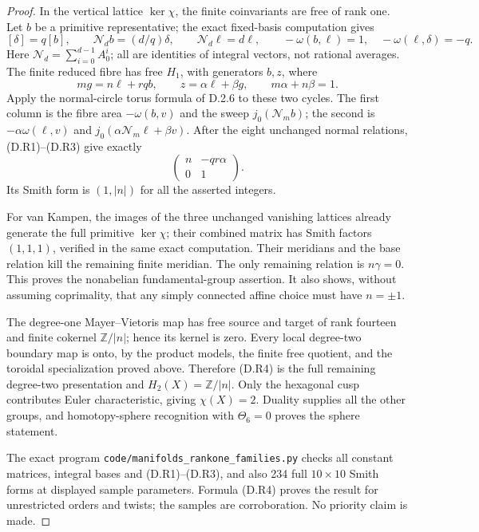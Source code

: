 \begin{proof}
In the vertical lattice $\ker\chi$, the finite coinvariants
are free of rank one. Let $b$ be a primitive representative;
the exact fixed-basis computation gives
\[
 [\delta]=q[b],\qquad
 \mathcal N_d b=(d/q)\delta,\qquad
 \mathcal N_d\ell=d\ell,\qquad
 -\omega(b,\ell)=1,\quad
 -\omega(\ell,\delta)=-q.
 \tag{D.R3}
\]
Here $\mathcal N_d=\sum_{i=0}^{d-1}A_0^i$; all are
identities of integral vectors, not rational averages.
The finite reduced fibre has free $H_1$, with generators
$b,z$, where
\[
 mg=n\ell+rq b,\qquad
 z=\alpha\ell+\beta g,\qquad m\alpha+n\beta=1.
\]
Apply the normal-circle torus formula of D.2.6 to these two
cycles. The first column is the fibre area
$-\omega(b,v)$ and the sweep $j_0(\mathcal N_m b)$;
the second is $-\alpha\omega(\ell,v)$ and
$j_0(\alpha\mathcal N_m\ell+\beta v)$.
After the eight unchanged normal relations, (D.R1)--(D.R3)
give exactly
\[
 \begin{pmatrix}n&-qr\alpha\\0&1\end{pmatrix}.
 \tag{D.R4}
\]
Its Smith form is $(1,|n|)$ for all the asserted integers.

For van Kampen, the images of the three unchanged vanishing
lattices already generate the full primitive $\ker\chi$;
their combined matrix has Smith factors $(1,1,1)$, verified
in the same exact computation. Their meridians and the base
relation kill the remaining finite meridian. The only remaining
relation is $n\gamma=0$. This proves the nonabelian
fundamental-group assertion. It also shows, without assuming
coprimality, that any simply connected affine choice must have
$n=\pm1$.

The degree-one Mayer--Vietoris map has free source and target
of rank fourteen and finite cokernel $\mathbb Z/|n|$; hence
its kernel is zero. Every local degree-two boundary map is
onto, by the product models, the finite free quotient, and
the toroidal specialization proved above. Therefore (D.R4)
is the full remaining degree-two presentation and
$H_2(X)=\mathbb Z/|n|$.
Only the hexagonal cusp contributes Euler characteristic,
giving $\chi(X)=2$. Duality supplies all the other groups,
and homotopy-sphere recognition with $\Theta_6=0$ proves
the sphere statement.

The exact program \texttt{code/manifolds\_rankone\_families.py}
checks all constant matrices, integral bases and (D.R1)--(D.R3),
and also 234 full $10\times10$ Smith forms at displayed
sample parameters. Formula (D.R4) proves the result for
unrestricted orders and twists; the samples are corroboration.
No priority claim is made.
\end{proof}

